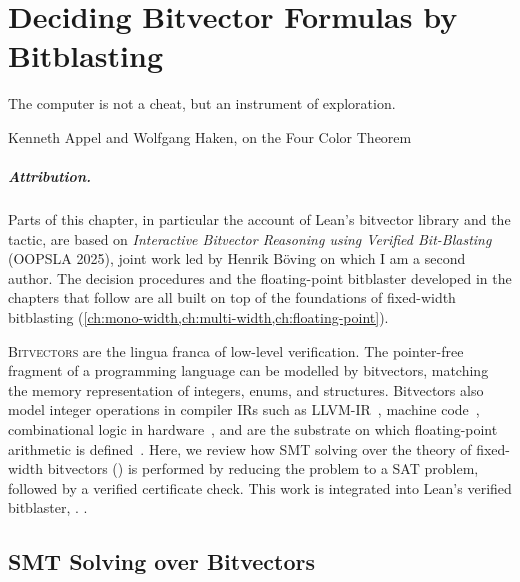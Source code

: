 \chapter{Deciding Bitvector Formulas by Bitblasting}
\label{ch:background-bv}
\epigraph{The computer is not a cheat, but an instrument of exploration.}{Kenneth Appel and Wolfgang Haken, on the Four Color Theorem}

\paragraph*{Attribution.} Parts of this chapter, in particular the account of
Lean's bitvector library and the \bvdecide{} tactic, are based on
\emph{Interactive Bitvector Reasoning using Verified
Bit-Blasting}~\citep{leanbv} (OOPSLA 2025), joint work led by Henrik Böving on
which I am a second author. The decision procedures and the
floating-point bitblaster developed in the chapters that follow are all built
on top of the foundations of fixed-width bitblasting (\cref{ch:mono-width,ch:multi-width,ch:floating-point}).

\lettrine{B}{itvectors} are the lingua franca of low-level verification.
The pointer-free fragment of a programming language can be modelled by
bitvectors, matching the memory representation of integers, enums, and
structures. Bitvectors also model integer operations in compiler IRs such
as LLVM-IR~\citep{zhao2012formalizing}, machine
code~\citep{armstrong2019isa,reid2016trustworthy}, combinational logic in
hardware~\citep{bourgeat2020essence}, and are the substrate on which
floating-point arithmetic is defined~\citep{boldo2011flocq}.
Here, we review how SMT solving over the theory of fixed-width bitvectors (\qfbv{})
is performed by reducing the problem to a SAT problem,
followed by a verified certificate check.
This work is integrated into Lean's verified bitblaster, \bvdecide{}.
\bvdecide{}.

\section{SMT Solving over Bitvectors}
\label{sec:bg:smt}

